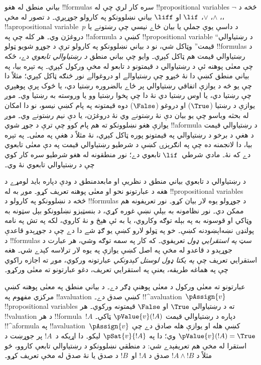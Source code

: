 \documentclass[../../../include/open-logic-section]{subfiles}
\begin{document}


بياني منطق له هغو !!{formula}s سره کار لري چې له
!!{propositional variable}s څخه د $\lnot$، $\land$، $\lor$، $\lif$ او
$\liff$ بياني نښلوونکو په کارولو جوړېږي۔ د تصور له مخې،
!!a{propositional variable}~$p$ د داسې يوې جملې يا بيان ځاے نيسي
چې رښتونے يا دروغژن وي۔ هر کله چې په !!a{formula} کښې د
!!{propositional variable} ``د رښتياوالي قيمت'' وټاکل شي، نو د
بياني نښلوونکو په کارولو ترې د جوړو شويو ټولو !!{formula}s د
رښتياوالي قيمت هم ټاکل کېږي۔ وايو چې بياني منطق \emph{د رښتياوالي
  تابعوي} دے، ځکه چې معنٰی پوهنه ئې د رښتياوالي د قيمتونو د تابعو
له مخې ورکول کېږي۔ په تېره بيا، په بياني منطق کښې دا نۀ څېړو چې
رښتياوالے او دروغوالے نور څنګه ټاکل کېږي؛ مثلاً دا چې يو څه د يوازې
اتفاقي رښتياوالي پر ځاے بالضروره رښتيا دي، يا څوک پرې پوهېږي چې
رښتيا دي، يا اوس رښتيا دي نۀ دا چې پخوا رښتيا وو يا وروسته به رښتيا
وي۔ موږ يوازې د رښتيا ($\True$) او دروغو ($\False$) دوه قيمتونه په
پام کښې نيسو، نو دا امکان له بحثه وباسو چې يو بيان دې نۀ رښتونے وي
نۀ دروغژن، يا دې نيم رښتونے وي۔ موږ يوازې هغو نښلوونکو ته هم پام
کوو چې ترې د جوړ شوي !!a{formula} د رښتياوالي قيمت د هغې د برخو د
رښتياوالي په قيمتونو پوره ټاکل کېږي، نۀ مثلاً د هغې په معنٰی۔ په
تېره بيا، دا لانجمنه ده چې په انګرېزۍ کښې د شرطيو رښتياوالي قيمت په
دې معنٰی تابعوي دے که نۀ۔ مادي شرطي~$\lif$ تابعوي دے؛ نور منطقونه
له هغو شرطيو سره کار کوي چې د رښتياوالي تابعوي نۀ وي۔

د رښتياوالي د تابعوي بياني منطق د نظريې او مابعدمنطق د ودې دپاره
بايد لومړے د هغه د عبارتونو نحو او معنٰی پوهنه تعريف کړو۔ موږ به له
!!{propositional variable}s څخه د نښلوونکو په کارولو د !!{formula}s
د جوړولو يوه لار بيان کړو۔ نور تعريفونه هم ممکن دي۔ نور نظامونه به
بېلې نښې غوره کړي، د بنسټيزو نښلوونکو بېل سټونه به وټاکي او قوسونه
به په بېله توګه وکاروي، يا به ئې هېڅ و نۀ کاروي، لکه په تش په نامه
پولنډۍ نښه‌اېښودنه کښې۔ خو په ټولو لارو کښې يو ګډ شے دا دے چې د
جوړېدو قاعدې د !!{formula}s سټ \emph{په استقرايي ډول} تعريفوي۔ که
کار په سمه توګه وشي، هر عبارت د جوړېدو د قاعدو له مخې په اصل کښې
يوازې په يوه لار ترلاسه کېدے شي۔ هغه استقرايي تعريف چې
\emph{په يکتا ډول لوستل کېدونکي} عبارتونه ورکوي، موږ ته اجازه راکوي
چې په هماغه طريقه، يعنې په استقرايي تعريف، دغو عبارتونو ته معنٰی
ورکړو۔

عبارتونو ته معنٰی ورکول د معنٰی پوهنې ډګر دے۔ د بياني منطق په
معنٰی پوهنه کښې مرکزي مفهوم په !!a{valuation} کښې صدق دے۔
!!^a{valuation}~$\pAssign{v}$ !!{propositional variable}s ته د
رښتياوالي $\True$ او $\False$ قيمتونه ورکوي۔ هر !!{valuation} د هر
!!{formula}~$!A$ دپاره د رښتياوالي قيمت $\pValue{v}(!A)$ ټاکي۔
!!^a{formula} په !!a{valuation}~$\pAssign{v}$ کښې هله او يوازې هله
صادق دے چې $\pValue{v}(!A) = \True$ وي؛ دا په $\pSat{v}{!A}$ ليکو۔
دا اړيکه د~$!A$ پر جوړښت د استقرا له مخې هم تعريفېدے شي: د منطقي
نښلوونکو د رښتياوالي تابعې کاروو، څو مثلاً د $!A \land !B$ صدق د
$!A$ او~$!B$ د صدق يا نۀ صدق له مخې تعريف کړو۔
\end{document}
